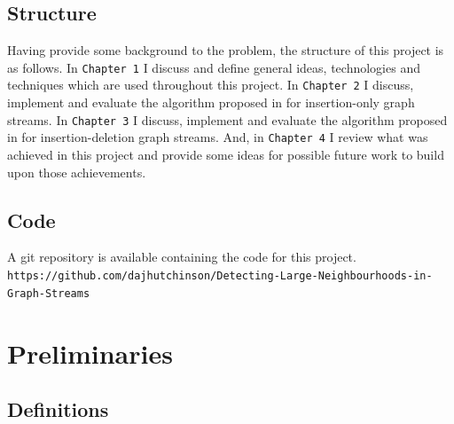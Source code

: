 \documentclass[11pt,twoside,a4paper]{report}
\begin{document}
\section{Structure}
Having provide some background to the problem, the structure of this project is as follows. In \texttt{Chapter 1} I discuss and define general ideas, technologies and techniques which are used throughout this project. In \texttt{Chapter 2} I discuss, implement and evaluate the algorithm proposed in \cite{orig} for insertion-only graph streams. In \texttt{Chapter 3} I discuss, implement and evaluate the algorithm proposed in \cite{orig} for insertion-deletion graph streams. And, in \texttt{Chapter 4} I review what was achieved in this project and provide some ideas for possible future work to build upon those achievements.

\section{Code}
A git repository is available containing the code for this project.\\
\texttt{https://github.com/dajhutchinson/Detecting-Large-Neighbourhoods-in-Graph-Streams}

\renewcommand\thechapter{\arabic{chapter}}
\renewcommand\thesection{\thechapter.\arabic{section}}
\renewcommand\thesubsection{\thesection.\arabic{subsection}}
\setcounter{chapter}{0}
\chapter{Preliminaries}

\setcounter{page}{1} %

\section{Definitions}

\end{document}
